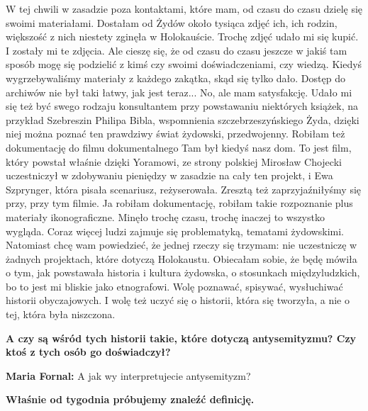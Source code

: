 {W tej chwili w zasadzie poza kontaktami, które mam, od czasu do czasu dzielę się swoimi materiałami. Dostałam od Żydów około tysiąca zdjęć ich, ich rodzin, większość z nich niestety zginęła w Holokauście. Trochę zdjęć udało mi się kupić. I zostały mi te zdjęcia. Ale cieszę się, że od czasu do czasu jeszcze w jakiś tam sposób mogę się podzielić z kimś czy swoimi doświadczeniami, czy wiedzą. Kiedyś wygrzebywaliśmy materiały z każdego zakątka, skąd się tylko dało. Dostęp do archiwów nie był taki łatwy, jak jest teraz... No, ale mam satysfakcję. Udało mi się też być swego rodzaju konsultantem przy powstawaniu niektórych książek, na przykład Szebreszin Philipa Bibla, wspomnienia szczebrzeszyńskiego Żyda, dzięki niej można poznać ten prawdziwy świat żydowski, przedwojenny. Robiłam też dokumentację do filmu dokumentalnego Tam był kiedyś nasz dom. To jest film, który powstał właśnie dzięki Yoramowi, ze strony polskiej Mirosław Chojecki uczestniczył w zdobywaniu pieniędzy w zasadzie na cały ten projekt, i Ewa Szprynger, która pisała scenariusz, reżyserowała. Zresztą też zaprzyjaźniłyśmy się przy, przy tym filmie. Ja robiłam dokumentację, robiłam takie rozpoznanie plus materiały ikonograficzne. Minęło trochę czasu, trochę inaczej to wszystko wygląda. Coraz więcej ludzi zajmuje się problematyką, tematami żydowskimi. Natomiast chcę wam powiedzieć, że jednej rzeczy się trzymam: nie uczestniczę w żadnych projektach, które dotyczą Holokaustu. Obiecałam sobie, że będę mówiła o tym, jak powstawała historia i kultura żydowska, o stosunkach międzyludzkich, bo to jest mi bliskie jako etnografowi. Wolę poznawać, spisywać, wysłuchiwać historii obyczajowych. I wolę też uczyć się o historii, która się tworzyła, a nie o tej, która była niszczona.  

\textbf{A czy są wśród tych historii takie, które dotyczą antysemityzmu? Czy ktoś z tych osób go doświadczył?}  

\textbf{Maria Fornal:} A jak wy interpretujecie antysemityzm? 

\textbf{Właśnie od tygodnia próbujemy znaleźć definicję.}

}
